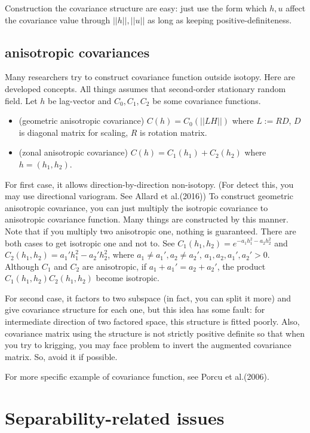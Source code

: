 \documentclass{article}
\begin{document}
Construction the covariance structure are easy: just use the form which $h,u$ affect the covariance value through $||h||, ||u||$
as long as keeping positive-definiteness.


\subsection{anisotropic covariances}
Many researchers try to construct covariance function outside isotopy. Here are developed concepts.
All things assumes that second-order stationary random field. Let $h$ be lag-vector and $C_0,C_1,C_2$ be some covariance functions.
\begin{itemize}
    \item (geometric anisotropic covariance) $C(h)=C_0(||LH||)$ where $L:=RD$, $D$ is diagonal matrix for scaling, $R$ is rotation matrix.
    \item (zonal anisotropic covariance) $C(h)=C_1(h_1)+C_2(h_2)$ where $h=(h_1,h_2)$.
\end{itemize}
For first case, it allows direction-by-direction non-isotopy. (For detect this, you may use directional variogram. See Allard et al.(2016))
To construct geometric anisotropic covariance, you can just multiply the isotropic covariance to anisotropic covariance function.
Many things are constructed by this manner. Note that if you multiply two anisotropic one, nothing is guaranteed. There are both cases to get isotropic one and not to.
See $C_1(h_1,h_2)=e^{-a_1 h_1^2-a_2 h_2^2}$ and $C_2(h_1,h_2)=a_1' h_1^2-a_2' h_2^2$, where $a_1\neq a_1', a_2 \neq a_2'$, $a_1,a_2,a_1',a_2'>0$.
Although $C_1$ and $C_2$ are anisotropic, if $a_1+a_1'=a_2+a_2'$, the product $C_1(h_1,h_2)C_2(h_1,h_2)$ become isotropic.

For second case, it factors to two subspace (in fact, you can split it more) and give covariance structure for each one,
but this idea has some fault: for intermediate direction of two factored space, this structure is fitted poorly.
Also, covariance matrix using the structure is not strictly positive definite so that when you try to krigging,
you may face problem to invert the augmented covariance matrix. So, avoid it if possible.

For more specific example of covariance function, see Porcu et al.(2006).


\section{Separability-related issues}
\end{document}
